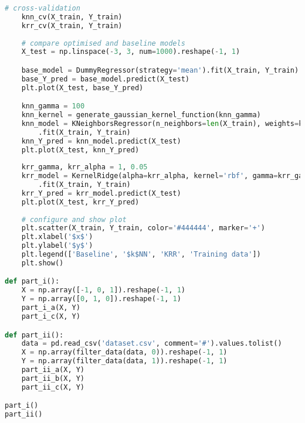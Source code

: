 \documentclass[12pt]{article}
\begin{document}
\begin{lstlisting}[language=Python]
    # cross-validation
    knn_cv(X_train, Y_train)
    krr_cv(X_train, Y_train)
    
    # compare optimised and baseline models
    X_test = np.linspace(-3, 3, num=1000).reshape(-1, 1)

    base_model = DummyRegressor(strategy='mean').fit(X_train, Y_train)
    base_Y_pred = base_model.predict(X_test)
    plt.plot(X_test, base_Y_pred)

    knn_gamma = 100
    knn_kernel = generate_gaussian_kernel_function(knn_gamma)
    knn_model = KNeighborsRegressor(n_neighbors=len(X_train), weights=knn_kernel)
        .fit(X_train, Y_train)
    knn_Y_pred = knn_model.predict(X_test)
    plt.plot(X_test, knn_Y_pred)
    
    krr_gamma, krr_alpha = 1, 0.05
    krr_model = KernelRidge(alpha=krr_alpha, kernel='rbf', gamma=krr_gamma)
        .fit(X_train, Y_train)
    krr_Y_pred = krr_model.predict(X_test)
    plt.plot(X_test, krr_Y_pred)
    
    # configure and show plot
    plt.scatter(X_train, Y_train, color='#444444', marker='+')
    plt.xlabel('$x$')
    plt.ylabel('$y$')
    plt.legend(['Baseline', '$k$NN', 'KRR', 'Training data'])
    plt.show()

def part_i():
    X = np.array([-1, 0, 1]).reshape(-1, 1)
    Y = np.array([0, 1, 0]).reshape(-1, 1)
    part_i_a(X, Y)
    part_i_c(X, Y)

def part_ii():
    data = pd.read_csv('dataset.csv', comment='#').values.tolist()
    X = np.array(filter_data(data, 0)).reshape(-1, 1)
    Y = np.array(filter_data(data, 1)).reshape(-1, 1)
    part_ii_a(X, Y)
    part_ii_b(X, Y)
    part_ii_c(X, Y)

part_i()
part_ii()
\end{lstlisting}
\end{document}
